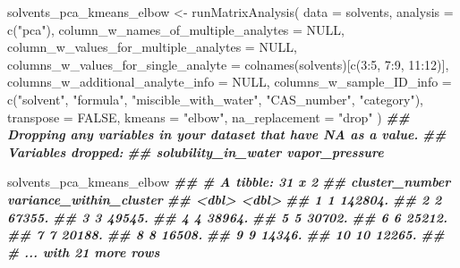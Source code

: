 \documentclass[
]{krantz}
\newenvironment{Shaded}{\begin{snugshade}}{\end{snugshade}}
\newcommand{\AttributeTok}[1]{\textcolor[rgb]{0.77,0.63,0.00}{#1}}
\newcommand{\ConstantTok}[1]{\textcolor[rgb]{0.00,0.00,0.00}{#1}}
\newcommand{\DecValTok}[1]{\textcolor[rgb]{0.00,0.00,0.81}{#1}}
\newcommand{\DocumentationTok}[1]{\textcolor[rgb]{0.56,0.35,0.01}{\textbf{\textit{#1}}}}
\newcommand{\FunctionTok}[1]{\textcolor[rgb]{0.00,0.00,0.00}{#1}}
\newcommand{\NormalTok}[1]{#1}
\newcommand{\OtherTok}[1]{\textcolor[rgb]{0.56,0.35,0.01}{#1}}
\newcommand{\SpecialCharTok}[1]{\textcolor[rgb]{0.00,0.00,0.00}{#1}}
\newcommand{\StringTok}[1]{\textcolor[rgb]{0.31,0.60,0.02}{#1}}
\begin{document}
\begin{Shaded}
\begin{Highlighting}[]
\NormalTok{solvents\_pca\_kmeans\_elbow }\OtherTok{\textless{}{-}} \FunctionTok{runMatrixAnalysis}\NormalTok{(}
  \AttributeTok{data =}\NormalTok{ solvents,}
  \AttributeTok{analysis =} \FunctionTok{c}\NormalTok{(}\StringTok{"pca"}\NormalTok{),}
  \AttributeTok{column\_w\_names\_of\_multiple\_analytes =} \ConstantTok{NULL}\NormalTok{,}
  \AttributeTok{column\_w\_values\_for\_multiple\_analytes =} \ConstantTok{NULL}\NormalTok{,}
  \AttributeTok{columns\_w\_values\_for\_single\_analyte =} \FunctionTok{colnames}\NormalTok{(solvents)[}\FunctionTok{c}\NormalTok{(}\DecValTok{3}\SpecialCharTok{:}\DecValTok{5}\NormalTok{, }\DecValTok{7}\SpecialCharTok{:}\DecValTok{9}\NormalTok{, }\DecValTok{11}\SpecialCharTok{:}\DecValTok{12}\NormalTok{)],}
  \AttributeTok{columns\_w\_additional\_analyte\_info =} \ConstantTok{NULL}\NormalTok{,}
  \AttributeTok{columns\_w\_sample\_ID\_info =} \FunctionTok{c}\NormalTok{(}\StringTok{"solvent"}\NormalTok{, }\StringTok{"formula"}\NormalTok{, }\StringTok{"miscible\_with\_water"}\NormalTok{, }\StringTok{"CAS\_number"}\NormalTok{, }\StringTok{"category"}\NormalTok{),}
  \AttributeTok{transpose =} \ConstantTok{FALSE}\NormalTok{,}
  \AttributeTok{kmeans =} \StringTok{"elbow"}\NormalTok{,}
  \AttributeTok{na\_replacement =} \StringTok{"drop"}
\NormalTok{)}
\DocumentationTok{\#\# Dropping any variables in your dataset that have NA as a value.}
\DocumentationTok{\#\# Variables dropped:}
\DocumentationTok{\#\# solubility\_in\_water vapor\_pressure}

\NormalTok{solvents\_pca\_kmeans\_elbow}
\DocumentationTok{\#\# \# A tibble: 31 x 2}
\DocumentationTok{\#\#    cluster\_number variance\_within\_cluster}
\DocumentationTok{\#\#             \textless{}dbl\textgreater{}                   \textless{}dbl\textgreater{}}
\DocumentationTok{\#\#  1              1                 142804.}
\DocumentationTok{\#\#  2              2                  67355.}
\DocumentationTok{\#\#  3              3                  49545.}
\DocumentationTok{\#\#  4              4                  38964.}
\DocumentationTok{\#\#  5              5                  30702.}
\DocumentationTok{\#\#  6              6                  25212.}
\DocumentationTok{\#\#  7              7                  20188.}
\DocumentationTok{\#\#  8              8                  16508.}
\DocumentationTok{\#\#  9              9                  14346.}
\DocumentationTok{\#\# 10             10                  12265.}
\DocumentationTok{\#\# \# ... with 21 more rows}
\end{Highlighting}
\end{Shaded}
\end{document}
